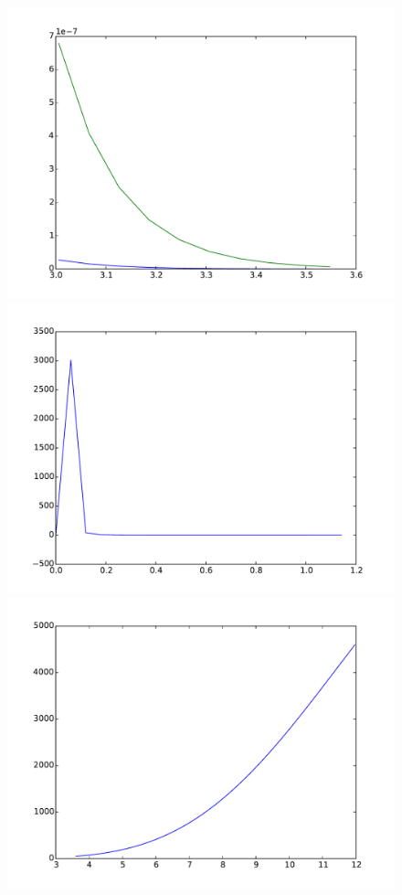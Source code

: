 \documentclass{article}
\begin{document}
\begin{figure}[htb]
\begin{minipage}{.45\textwidth}
		\includegraphics[width=0.97\linewidth]{bootstrap-filter/tail_complex_3_3.pdf}
	\end{minipage}
	\begin{minipage}{.45\textwidth}
		\centering
		\includegraphics[width=0.97\linewidth]{bootstrap-filter/relative_beginning_complex_3_3.pdf}
	\end{minipage}
	\begin{minipage}{.45\textwidth}
		\centering
		\includegraphics[width=0.97\linewidth]{bootstrap-filter/relative_tail_complex_3_3.pdf}

\end{minipage}
\end{figure}
\end{document}
